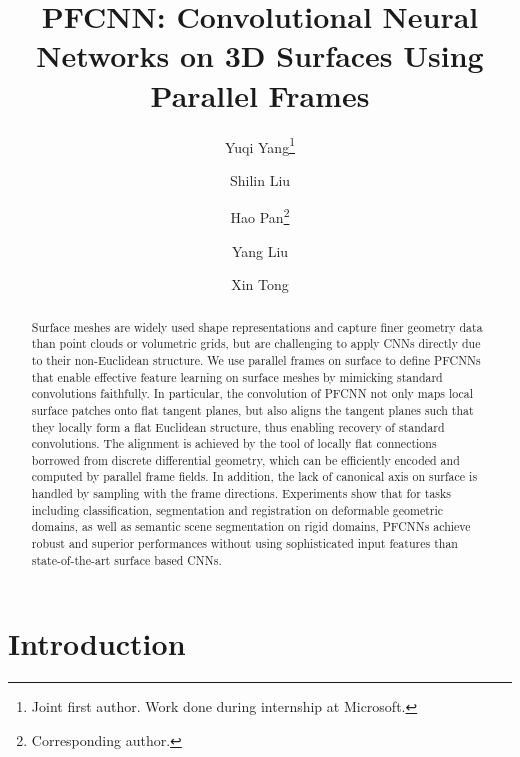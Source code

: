 \documentclass[10pt,twocolumn,letterpaper]{article}
\begin{document}
\title{PFCNN: Convolutional Neural Networks on 3D Surfaces Using Parallel Frames}

\author[1,3]{\vspace{-7mm}Yuqi Yang\thanks{Joint first author. Work done during internship at Microsoft.}}
\author[2,3]{Shilin Liu\protect\footnotemark[1]}
\author[3]{Hao Pan\thanks{Corresponding author.}}
\author[3]{Yang Liu}
\author[3]{Xin Tong\vspace{-4mm}}


\maketitle

\begin{abstract}
   Surface meshes are widely used shape representations and capture finer geometry data than point clouds or volumetric grids, but are challenging to apply CNNs directly due to their non-Euclidean structure.
   We use parallel frames on surface to define PFCNNs that enable effective feature learning on surface meshes by mimicking standard convolutions faithfully.
   In particular, the convolution of PFCNN not only maps local surface patches onto flat tangent planes, but also aligns the tangent planes such that they locally form a flat Euclidean structure, thus enabling recovery of standard convolutions.
   The alignment is achieved by the tool of locally flat connections borrowed from discrete differential geometry, which can be efficiently encoded and computed by parallel frame fields.
   In addition, the lack of canonical axis on surface is handled by sampling with the frame directions.
   Experiments show that for tasks including classification, segmentation and registration on deformable geometric domains, as well as semantic scene segmentation on rigid domains, PFCNNs achieve robust and superior performances without using sophisticated input features than state-of-the-art surface based CNNs.
\end{abstract}

\section{Introduction}
\end{document}
